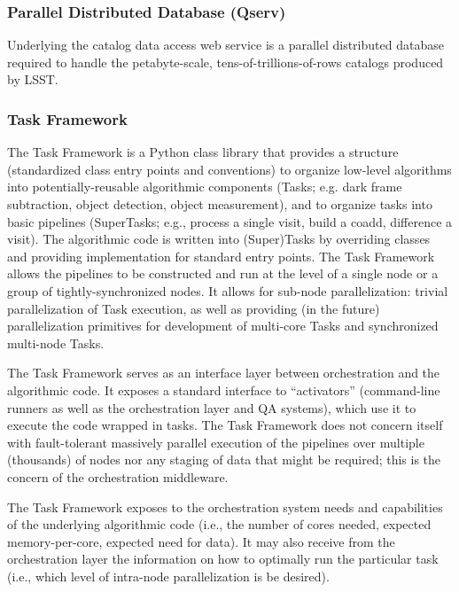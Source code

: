 \documentclass[]{article}
\begin{document}
\subsubsection{Parallel Distributed Database
(Qserv)}\label{parallel-distributed-database-qserv}

Underlying the catalog data access web service is a parallel distributed
database required to handle the petabyte-scale,
tens-of-trillions-of-rows catalogs produced by LSST.

\subsubsection{Task Framework}\label{task-framework}

The Task Framework is a Python class library that provides a structure
(standardized class entry points and conventions) to organize low-level
algorithms into potentially-reusable algorithmic components (Tasks; e.g.
dark frame subtraction, object detection, object measurement), and to
organize tasks into basic pipelines (SuperTasks; e.g., process a single
visit, build a coadd, difference a visit). The algorithmic code is
written into (Super)Tasks by overriding classes and providing
implementation for standard entry points. The Task Framework allows the
pipelines to be constructed and run at the level of a single node or a
group of tightly-synchronized nodes. It allows for sub-node
parallelization: trivial parallelization of Task execution, as well as
providing (in the future) parallelization primitives for development of
multi-core Tasks and synchronized multi-node Tasks.

The Task Framework serves as an interface layer between orchestration
and the algorithmic code. It exposes a standard interface to
``activators'' (command-line runners as well as the orchestration layer
and QA systems), which use it to execute the code wrapped in tasks. The
Task Framework does not concern itself with fault-tolerant massively
parallel execution of the pipelines over multiple (thousands) of nodes
nor any staging of data that might be required; this is the concern of
the orchestration middleware.

The Task Framework exposes to the orchestration system needs and
capabilities of the underlying algorithmic code (i.e., the number of
cores needed, expected memory-per-core, expected need for data). It may
also receive from the orchestration layer the information on how to
optimally run the particular task (i.e., which level of intra-node
parallelization is be desired).
\end{document}
